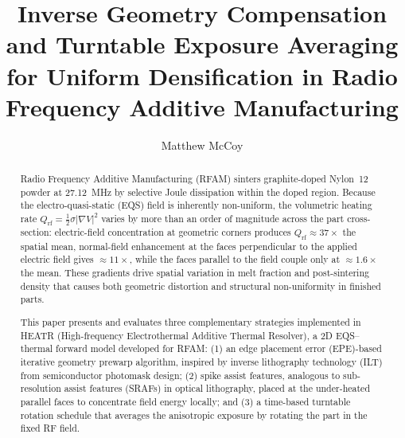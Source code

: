 \documentclass[5p,times]{elsarticle}
\newcommand{\Qrf}{Q_{\mathrm{rf}}}
\newcommand{\half}{\tfrac{1}{2}}
\begin{document}

\begin{frontmatter}

\title{Inverse Geometry Compensation and Turntable Exposure
Averaging for Uniform Densification in Radio Frequency Additive
Manufacturing}

\author[gatech]{Matthew McCoy}
\address[gatech]{School of Mechanical Engineering, Georgia Institute of
Technology, Atlanta, Georgia 30332, USA}

\begin{abstract}
Radio Frequency Additive Manufacturing (RFAM) sinters graphite-doped
Nylon~12 powder at \SI{27.12}{\mega\hertz} by selective Joule
dissipation within the doped region.  Because the electro-quasi-static
(EQS) field is inherently non-uniform, the volumetric heating rate
$\Qrf = \half\sigma|\nabla V|^{2}$ varies by more than an order of
magnitude across the part cross-section: electric-field concentration
at geometric corners produces $\Qrf \approx 37\times$ the spatial
mean, normal-field enhancement at the faces perpendicular to the applied
electric field gives $\approx 11\times$, while the faces parallel to
the field couple only at $\approx 1.6\times$ the mean.  These gradients
drive spatial variation in melt fraction and post-sintering density that
causes both geometric distortion and structural non-uniformity in
finished parts.

This paper presents and evaluates three complementary strategies
implemented in HEATR (High-frequency Electrothermal Additive Thermal
Resolver), a 2D EQS--thermal forward model developed for RFAM: (1) an
edge placement error (EPE)-based iterative geometry prewarp algorithm,
inspired by inverse lithography technology (ILT) from semiconductor
photomask design; (2) spike assist features, analogous to sub-resolution
assist features (SRAFs) in optical lithography, placed at the
under-heated parallel faces to concentrate field energy locally; and
(3) a time-based turntable rotation schedule that averages the
anisotropic exposure by rotating the part in the fixed RF field.


\end{abstract}
\end{frontmatter}
\end{document}
